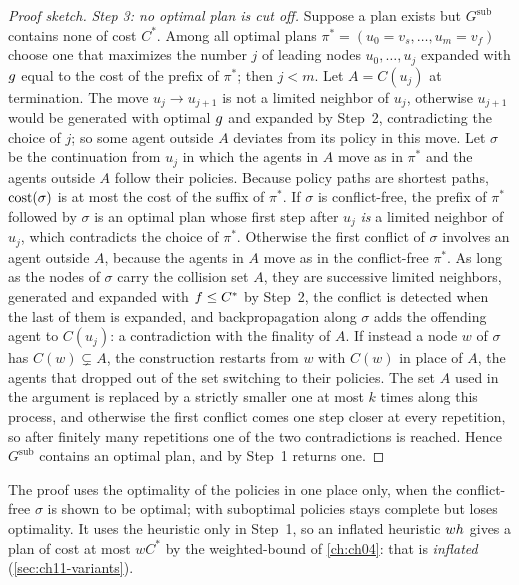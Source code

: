 \begin{proof}[Proof sketch]
\emph{Step 3: no optimal plan is cut off.} Suppose a plan exists but
$G^{\mathrm{sub}}$ contains none of cost $C^*$. Among all optimal plans
$\pi^* = (u_0 = v_s, \dots, u_m = v_f)$ choose one that maximizes the number
$j$ of leading nodes $u_0, \dots, u_j$ expanded with $g$ equal to the
cost of the prefix of $\pi^*$; then $j < m$. Let $A = C(u_j)$ at
termination. The move $u_j \to u_{j+1}$ is not a limited neighbor of
$u_j$, otherwise $u_{j+1}$ would be generated with optimal $g$ and
expanded by Step~2, contradicting the choice of $j$; so some agent outside
$A$ deviates from its policy in this move. Let $\sigma$ be the continuation
from $u_j$ in which the agents in $A$ move as in $\pi^*$ and the agents
outside $A$ follow their policies. Because policy paths are shortest paths,
$\operatorname{cost}(\sigma)$ is at most the cost of the suffix of $\pi^*$. If $\sigma$ is
conflict-free, the prefix of $\pi^*$ followed by $\sigma$ is an optimal plan
whose first step after $u_j$ \emph{is} a limited neighbor of $u_j$, which
contradicts the choice of $\pi^*$. Otherwise the first conflict of $\sigma$
involves an agent outside $A$, because the agents in $A$ move as in the
conflict-free $\pi^*$. As long as the nodes of $\sigma$ carry the collision
set $A$, they are successive limited neighbors, generated and expanded
with $f \le C^*$ by Step~2, the conflict is detected when the last of
them is expanded, and backpropagation along $\sigma$ adds the offending
agent to $C(u_j)$: a contradiction with the finality of $A$. If instead a
node $w$ of $\sigma$ has $C(w) \subsetneq A$, the construction restarts from
$w$ with $C(w)$ in place of $A$, the agents that dropped out of the set
switching to their policies. The set $A$ used in the argument is replaced
by a strictly smaller one at most $k$ times along this process, and otherwise the first conflict comes one step closer
at every repetition, so after finitely many repetitions one of the two
contradictions is reached. Hence $G^{\mathrm{sub}}$ contains an optimal plan,
and by Step~1 \mstar returns one.
\end{proof}

The proof uses the optimality of the policies in one place only, when the
conflict-free $\sigma$ is shown to be optimal; with suboptimal policies
\mstar stays complete but loses optimality. It uses the heuristic only in
Step~1, so an inflated heuristic $wh$ gives a plan of cost at most
$wC^*$ by the weighted-\astar bound of \cref{ch:ch04}: that is
\emph{inflated} \mstar (\cref{sec:ch11-variants}).

